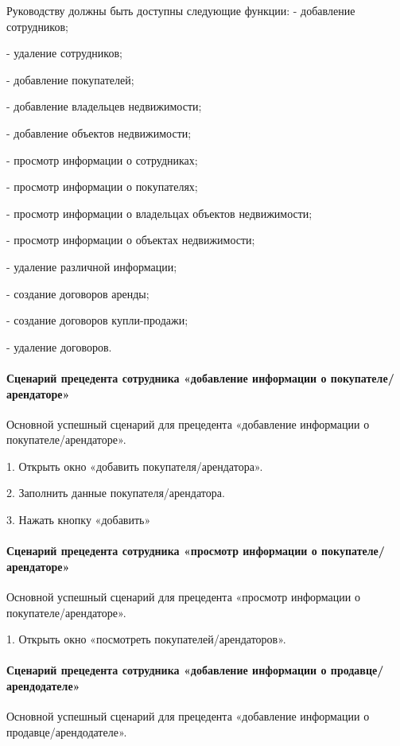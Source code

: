 Руководству должны быть доступны следующие функции:
-	добавление сотрудников;

-	удаление сотрудников;

-	добавление покупателей;

-	добавление владельцев недвижимости;

-	добавление объектов недвижимости;

-	просмотр информации о сотрудниках;

-	просмотр информации о покупателях;

-	просмотр информации о владельцах объектов недвижимости;

-	просмотр информации о объектах недвижимости;

-	удаление  различной информации;

-	создание договоров аренды;

-	создание договоров купли-продажи;

-	удаление договоров.

\paragraph{Сценарий прецедента сотрудника «добавление информации о покупателе/арендаторе»}

Основной успешный сценарий для прецедента «добавление информации о покупателе/арендаторе».

1.	Открыть окно «добавить покупателя/арендатора».

2.	Заполнить данные покупателя/арендатора.

3.	Нажать кнопку «добавить»

\paragraph{Сценарий прецедента сотрудника «просмотр информации о покупателе/арендаторе»}

Основной успешный сценарий для прецедента «просмотр информации о покупателе/арендаторе».

1.	Открыть окно «посмотреть покупателей/арендаторов».

\paragraph{Сценарий прецедента сотрудника «добавление информации о продавце/арендодателе»}

Основной успешный сценарий для прецедента «добавление информации о продавце/арендодателе».


